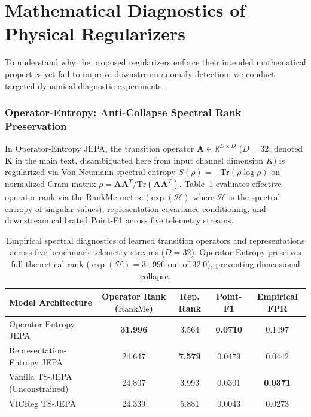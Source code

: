 \section{Mathematical Diagnostics of Physical Regularizers}
\label{sup:math_diagnostics}

To understand why the proposed regularizers enforce their intended mathematical properties yet fail to improve downstream anomaly detection, we conduct targeted dynamical diagnostic experiments.

\subsubsection{Operator-Entropy: Anti-Collapse Spectral Rank Preservation}
In Operator-Entropy JEPA, the transition operator $\mathbf{A} \in \mathbb{R}^{D \times D}$ ($D=32$; denoted $\mathbf{K}$ in the main text, disambiguated here from input channel dimension $K$) is regularized via Von Neumann spectral entropy $S(\rho) = -\text{Tr}(\rho \log \rho)$ on normalized Gram matrix $\rho = \mathbf{A}\mathbf{A}^T / \text{Tr}(\mathbf{A}\mathbf{A}^T)$. Table~\ref{tab:operator_entropy_validation} evaluates effective operator rank via the RankMe metric ($\exp(\mathcal{H})$ where $\mathcal{H}$ is the spectral entropy of singular values), representation covariance conditioning, and downstream calibrated Point-F1 across five telemetry streams.

\begin{table}[t]
\centering
\small
\caption{Empirical spectral diagnostics of learned transition operators and representations across five benchmark telemetry streams ($D=32$). Operator-Entropy preserves full theoretical rank ($\exp(\mathcal{H}) = 31.996$ out of 32.0), preventing dimensional collapse.}
\label{tab:operator_entropy_validation}
\scriptsize
\setlength{\tabcolsep}{2.5pt}
\begin{tabular}{@{}lcccc@{}}
\toprule
\textbf{Model Architecture} & \textbf{Operator Rank ($\text{RankMe}$)} & \textbf{Rep. Rank} & \textbf{Point-F1} & \textbf{Empirical FPR} \\
\midrule
Operator-Entropy JEPA & \textbf{31.996} & 3.564 & \textbf{0.0710} & 0.1497 \\
Representation-Entropy JEPA & 24.647 & \textbf{7.579} & 0.0479 & 0.0442 \\
Vanilla TS-JEPA (Unconstrained) & 24.807 & 3.993 & 0.0301 & \textbf{0.0371} \\
VICReg TS-JEPA & 24.339 & 5.881 & 0.0043 & 0.0273 \\
\bottomrule
\end{tabular}
\end{table}

